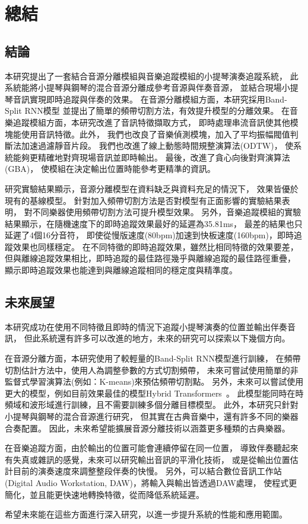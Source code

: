 \documentclass[class=NCU_thesis, crop=false]{standalone}
\begin{document}
\chapter{總結}

\section{結論}
本研究提出了一套結合音源分離模組與音樂追蹤模組的小提琴演奏追蹤系統，
此系統能將小提琴與鋼琴的混合音源分離成參考音源與伴奏音源，
並結合現場小提琴音訊實現即時追蹤與伴奏的效果。
在音源分離模組方面，本研究採用Band-Split RNN模型
並提出了簡單的頻帶切割方法，有效提升模型的分離效果。
在音樂追蹤模組方面，本研究改進了音訊特徵擷取方式，
即時處理串流音訊使其他模塊能使用音訊特徵。此外，
我們也改良了音樂偵測模塊，加入了平均振幅閥值判斷法加速過濾靜音片段。
我們也改進了線上動態時間規整演算法(ODTW)，
使系統能夠更精確地對齊現場音訊並即時輸出。
最後，改進了貪心向後對齊演算法(GBA)，
使模組在決定輸出位置時能參考更精準的資訊。

研究實驗結果顯示，音源分離模型在資料缺乏與資料充足的情況下，
效果皆優於現有的基線模型。
針對加入頻帶切割方法是否對模型有正面影響的實驗結果表明，
對不同樂器使用頻帶切割方法可提升模型效果。
另外，音樂追蹤模組的實驗結果顯示，在隨機速度下的即時追蹤效果最好的延遲為35.81ms，
最差的結果也只延遲了4個16分音符，
即使從慢版速度(80bpm)加速到快板速度(160bpm)，即時追蹤效果也同樣穩定。
在不同特徵的即時追蹤效果，雖然比相同特徵的效果要差，
但與離線追蹤效果相比，即時追蹤的最佳路徑幾乎與離線追蹤的最佳路徑重疊，
顯示即時追蹤效果也能達到與離線追蹤相同的穩定度與精準度。

\pagebreak

\section{未來展望}
本研究成功在使用不同特徵且即時的情況下追蹤小提琴演奏的位置並輸出伴奏音訊，
但此系統還有許多可以改進的地方，未來的研究可以探索以下幾個方向。

在音源分離方面，本研究使用了較輕量的Band-Split RNN模型進行訓練，
在頻帶切割估計方法中，使用人為調整參數的方式切割頻帶，
未來可嘗試使用簡單的非監督式學習演算法(例如：K-means)來預估頻帶切割點。
另外，未來可以嘗試使用更大的模型，例如目前效果最佳的模型Hybrid Transformers~\cite{rouard2023hybrid}。
此模型能同時在時頻域和波形域進行訓練，且不需要訓練多個分離目標模型。
此外，本研究只針對小提琴與鋼琴的混合音源進行研究，
但其實在古典音樂中，還有許多不同的樂器合奏配置。
因此，未來希望能擴展音源分離技術以涵蓋更多種類的古典樂器。

在音樂追蹤方面，由於輸出的位置可能會連續停留在同一位置，
導致伴奏聽起來有失真或雜訊的感覺，未來可以研究輸出音訊的平滑化技術，
或是從輸出位置估計目前的演奏速度來調整整段伴奏的快慢。
另外，可以結合數位音訊工作站(Digital Audio Workstation, DAW)，將輸入與輸出皆透過DAW處理，
使程式更簡化，並且能更快速地轉換特徵，從而降低系統延遲。

希望未來能在這些方面進行深入研究，以進一步提升系統的性能和應用範圍。


\end{document}
